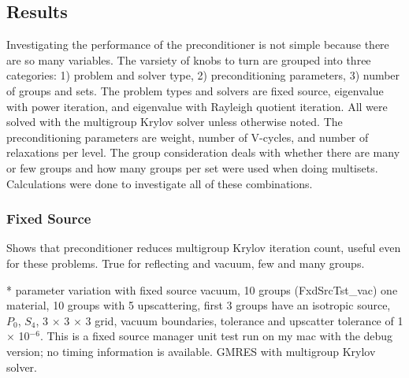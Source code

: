 \subsection{Results}
Investigating the performance of the preconditioner is not simple because there are so many variables. The varsiety of knobs to turn are grouped into three categories: 1) problem and solver type, 2) preconditioning parameters, 3) number of groups and sets. The problem types and solvers are fixed source, eigenvalue with power iteration, and eigenvalue with Rayleigh quotient iteration. All were solved with the multigroup Krylov solver unless otherwise noted. The preconditioning parameters are weight, number of V-cycles, and number of relaxations per level. The group consideration deals with whether there are many or few groups and how many groups per set were used when doing multisets. Calculations were done to investigate all of these combinations.

\subsubsection{Fixed Source}
Shows that preconditioner reduces multigroup Krylov iteration count, useful even for these problems. True for reflecting and vacuum, few and many groups.

* parameter variation with fixed source vacuum, 10 groups (FxdSrcTst\_vac)
one material, 10 groups with 5 upscattering, first 3 groups have an isotropic source, $P_{0}$, $S_{4}$, 3 $\times$ 3 $\times$ 3 grid, vacuum boundaries, tolerance and upscatter tolerance of 1 $\times$ 10$^{-6}$. This is a fixed source manager unit test run on my mac with the debug version; no timing information is available. GMRES with multigroup Krylov solver. 

